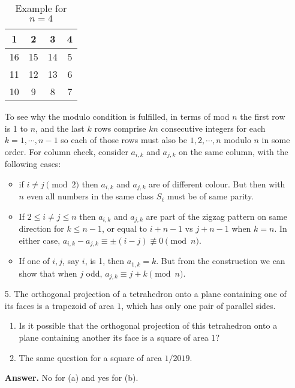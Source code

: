 \documentclass[11pt,a4paper]{article}
\begin{document}
\begin{enumerate}
	\begin{table}[H]
		\centering 
		\begin{tabular}{|c|c|c|c|}
			\hline
			1 & 2 & 3 & 4\\
			\hline
			16 & 15 & 14 & 5\\
			\hline
			11 & 12 & 13 & 6\\
			\hline
			10 & 9 & 8 & 7\\
			\hline
		\end{tabular}
		\caption{Example for $n=4$}
		\label{tab:q4}
	\end{table}
    To see why the modulo condition is fulfilled, in terms of mod $n$ the first row is 1 to $n$, 
    and the last $k$ rows comprise $kn$ consecutive integers for each $k=1, \cdots, n-1$ so each of those rows must also be $1, 2, \cdots, n$ modulo $n$ in some order. 
    For column check, consider $a_{i, k}$ and $a_{j, k}$ on the same column, with the following cases: 
    \begin{itemize}
    	\item if $i\neq j\pmod{2}$ then $a_{i, k}$ and $a_{j, k}$ are of different colour. But then with $n$ even all numbers in the same class $S_{\ell}$ must be of same parity. 
    	
    	\item If $2\le i\neq j\le n$ then $a_{i, k}$ and $a_{j, k}$ are part of the zigzag pattern on same direction for $k\le n-1$, or equal to $i+n-1$ vs $j+n-1$ when $k=n$. 
    	In either case,  $a_{i, k}-a_{j, k}\equiv\pm (i-j)\not\equiv 0\pmod{n}$. 
    	
    	\item If one of $i, j$, say $i$, is 1, then $a_{1, k}=k$. But from the construction we can show that when $j$ odd, 
    	$a_{j, k}\equiv j+k\pmod{n}$. 
    \end{itemize}
	
	\item[5.]
	The orthogonal projection of a tetrahedron onto a plane containing one of its faces is a trapezoid of area $1$, which has only one pair of parallel sides.
	\begin{enumerate}
		\item Is it possible that the orthogonal projection of this tetrahedron onto a plane containing another its face is a square of area $1$?
		\item The same question for a square of area $1/2019$.
	\end{enumerate}
    
    \textbf{Answer.} No for (a) and yes for (b). 
    

\end{enumerate}
\end{document}
